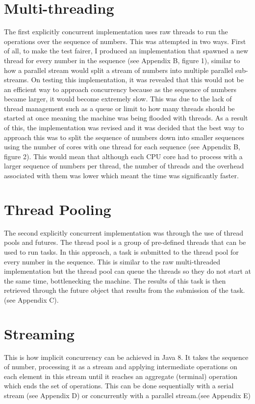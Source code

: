 \documentclass[]{report}
\begin{document}
\section{Multi-threading}
The first explicitly concurrent implementation uses raw threads to run the operations over the sequence of numbers. This was attempted in two ways. First of all, to make the test fairer, I produced an implementation that spawned a new thread for every number in the sequence (see Appendix B, figure 1), similar to how a parallel stream would split a stream of numbers into multiple parallel sub-streams. On testing this implementation, it was revealed that this would not be an efficient way to approach concurrency because  as the sequence of numbers became larger, it would become extremely slow. This was due to the lack of thread management such as a queue or limit to how many threads should be started at once meaning the machine was being flooded with threads. As a result of this, the implementation was revised and it was decided that the best way to approach this was to split the sequence of numbers down into smaller sequences using the number of cores with one thread for each sequence (see Appendix B, figure 2). This would mean that although each CPU core had to process with a larger sequence of numbers per thread, the number of threads and the overhead associated with them was lower which meant the time was significantly faster.
 
\section{Thread Pooling}
The second explicitly concurrent implementation was through the use of thread pools and futures. The thread pool is a group of pre-defined threads that can be used to run tasks. In this approach, a task is submitted to the thread pool for every number in the sequence. This is similar to the raw multi-threaded implementation but the thread pool can queue the threads so they do not start at the same time, bottlenecking the machine. The results of this task is then retrieved through the future object that results from the submission of the task. (see Appendix C).

\section{Streaming}
This is how implicit concurrency can be achieved in Java 8. It takes the sequence of number, processing it as a stream and applying intermediate operations on each element in this stream until it reaches an aggregate (terminal) operation which ends the set of operations. This can be done sequentially with a serial stream (see Appendix D) or concurrently with a parallel stream.(see Appendix E)
\end{document}
